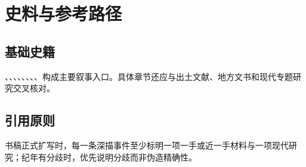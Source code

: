 \chapter{史料与参考路径}
\section{基础史籍}
、、、、、、、、构成主要叙事入口。具体章节还应与出土文献、地方文书和现代专题研究交叉核对。

\section{引用原则}
书稿正式扩写时，每一条深描事件至少标明一项一手或近一手材料与一项现代研究；纪年有分歧时，优先说明分歧而非伪造精确性。
